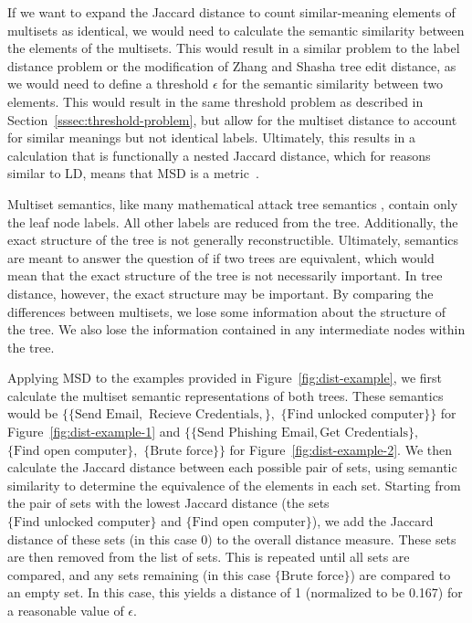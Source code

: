 If we want to expand the Jaccard distance to count similar-meaning elements of multisets as identical, we would need to calculate the semantic similarity between the elements of the multisets. This would result in a similar problem to the label distance problem or the modification of Zhang and Shasha tree edit distance, as we would need to define a threshold $\epsilon$ for the semantic similarity between two elements. This would result in the same threshold problem as described in Section~\ref{sssec:threshold-problem}, but allow for the multiset distance to account for similar meanings but not identical labels. Ultimately, this results in a calculation that is functionally a nested Jaccard distance, which for reasons similar to LD, means that MSD is a metric~\cite{kosub2019note}.

Multiset semantics, like many mathematical attack tree semantics \cite{jhawar_attack_2015,mauw_foundations_2006}, contain only the leaf node labels. All other labels are reduced from the tree. Additionally, the exact structure of the tree is not generally reconstructible. Ultimately, semantics are meant to answer the question of if two trees are equivalent, which would mean that the exact structure of the tree is not necessarily important. In tree distance, however, the exact structure may be important. By comparing the differences between multisets, we lose some information about the structure of the tree. We also lose the information contained in any intermediate nodes within the tree.

Applying MSD to the examples provided in Figure~\ref{fig:dist-example}, we first calculate the multiset semantic representations of both trees. These semantics would be $\{\{\text{Send Email},$ $\text{Recieve Credentials},\},$ $\{\text{Find unlocked computer}\}\}$ for Figure~\ref{fig:dist-example-1} and $\{\{\text{Send Phishing Email}, \text{Get Credentials}\},$ $\{\text{Find open computer}\},$ $\{\text{Brute force}\}\}$ for Figure~\ref{fig:dist-example-2}. We then calculate the Jaccard distance between each possible pair of sets, using semantic similarity to determine the equivalence of the elements in each set. Starting from the pair of sets with the lowest Jaccard distance (the sets $\{\text{Find unlocked computer}\}$ and $\{\text{Find open computer}\}$), we add the Jaccard distance of these sets (in this case 0) to the overall distance measure. These sets are then removed from the list of sets. This is repeated until all sets are compared, and any sets remaining (in this case $\{\text{Brute force}\}$) are compared to an empty set. In this case, this yields a distance of 1 (normalized to be 0.167) for a reasonable value of $\epsilon$.



